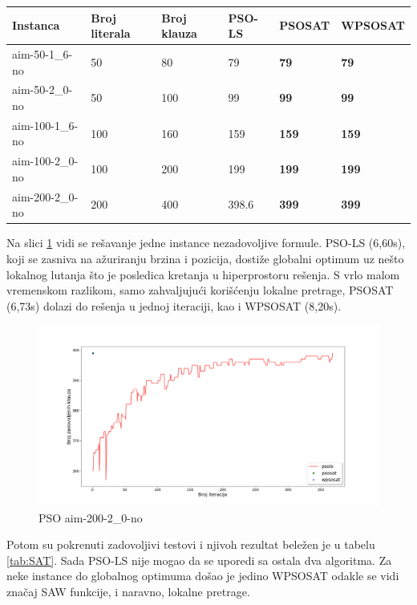 \documentclass[a4paper]{article}
\begin{document}
\begin{table}[h!]
\centering
{}\label{tab:UNSAT}
\begin{tabular}{ |p{2.5cm}|p{1.4cm}|p{1.4cm}||p{1.6cm}|p{1.6cm}|p{1.6cm}| } 
\hline
 Instanca & Broj \break literala & Broj \break klauza & PSO-LS & PSOSAT & WPSOSAT \\ 
 \hline
 aim-50-1\_6-no & 50 & 80 & 79 & \textbf{79} & \textbf{79} \\ 
 aim-50-2\_0-no & 50 & 100 & 99 & \textbf{99} & \textbf{99} \\
 aim-100-1\_6-no & 100 & 160 & 159 & \textbf{159} & \textbf{159} \\
 aim-100-2\_0-no & 100 & 200 & 199 & \textbf{199} & \textbf{199} \\
 aim-200-2\_0-no & 200 & 400 & 398.6 & \textbf{399} & \textbf{399} \\
 \hline
\end{tabular}
\end{table}

Na slici \ref{img:pso-200-2-no} vidi se rešavanje jedne instance nezadovoljive formule.
PSO-LS (6,60s), koji se zasniva na ažuriranju brzina i pozicija, dostiže globalni optimum
uz nešto lokalnog lutanja što je posledica kretanja u hiperprostoru rešenja.
S vrlo malom vremenskom razlikom, samo zahvaljujući korišćenju lokalne pretrage, 
PSOSAT (6,73s) dolazi do rešenja u jednoj iteraciji, kao i WPSOSAT (8,20s). \\

\begin{figure}[h!]
\centering
\includegraphics[width=\textwidth]{pso-aim-200-2_0-no}
\caption{PSO aim-200-2\_0-no}\label{img:pso-200-2-no}
\end{figure}

Potom su pokrenuti zadovoljivi testovi i njivoh rezultat beležen je u tabelu
\ref{tab:SAT}. Sada PSO-LS nije mogao da se uporedi sa ostala dva algoritma. 
Za neke instance do globalnog optimuma došao je jedino WPSOSAT odakle se vidi značaj 
SAW funkcije, i naravno, lokalne pretrage.
\end{document}
